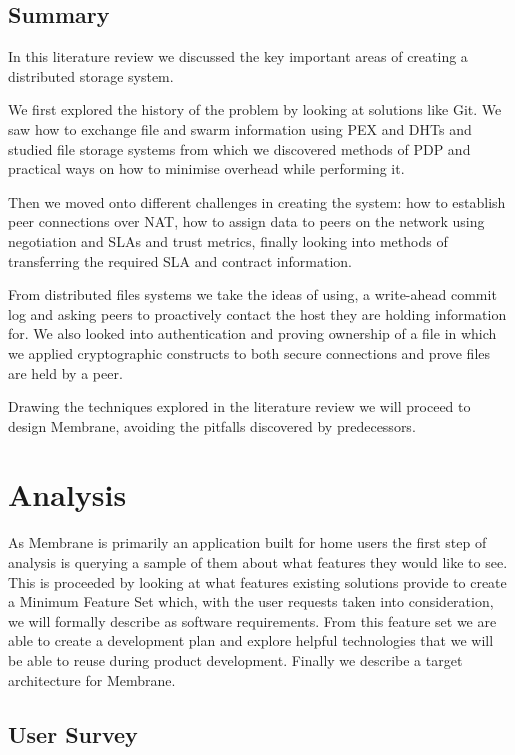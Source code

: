 \documentclass[11pt, a4paper, twoside]{report}
\begin{document}
\section{Summary}
In this literature review we discussed the key important areas of creating a distributed storage system.

We first explored the history of the problem by looking at solutions like Git. We saw how to exchange file and swarm information using PEX and DHTs and studied file storage systems from which we discovered methods of PDP and practical ways on how to minimise overhead while performing it.

Then we moved onto different challenges in creating the system: how to establish peer connections over NAT, how to assign data to peers on the network using negotiation and SLAs and trust metrics, finally looking into methods of transferring the required SLA and contract information.

From distributed files systems we take the ideas of using, a write-ahead commit log and asking peers to proactively contact the host they are holding information for. We also looked into authentication and proving ownership of a file in which we applied cryptographic constructs to both secure connections and prove files are held by a peer.

Drawing the techniques explored in the literature review we will proceed to design Membrane, avoiding the pitfalls discovered by predecessors.










\chapter{Analysis}

As Membrane is primarily an application built for home users the first step of analysis is querying a sample of them about what features they would like to see. This is proceeded by looking at what features existing solutions provide to create a Minimum Feature Set which, with the user requests taken into consideration, we will formally describe as software requirements. From this feature set we are able to create a development plan and explore helpful technologies that we will be able to reuse during product development. Finally we describe a target architecture for Membrane.

\section{User Survey}
\end{document}
